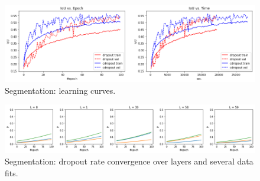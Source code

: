 \documentclass{article}
\begin{document}
\begin{figure}[!h]
\centering
\centering
\includegraphics[width=0.7\linewidth]{time_iou_comparison.png}
\caption{Segmentation: learning curves.}
\label{fig:segcurve}
\end{figure}

\begin{figure}[!h]
\centering
\centering
\includegraphics[width=\linewidth]{dropout_rate_convergence.png}
\caption{Segmentation: dropout rate convergence over layers and several data fits.}
\label{fig:segconv}
\end{figure}
\end{document}
